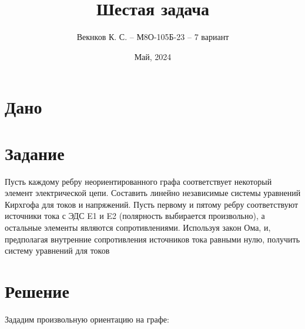 \documentclass{article}
\title{Шестая задача}
\author{Векнков К. С. -- М8О-105Б-23 -- 7 вариант}
\date{Май, 2024}
\begin{document}
\maketitle

\section*{Дано}
\begin{center}
\end{center}


\section*{Задание}
Пусть каждому ребру неориентированного графа соответствует некоторый элемент 
электрической цепи. Составить линейно независимые системы уравнений Кирхгофа для
токов и напряжений. Пусть первому и пятому ребру соответствуют источники тока с ЭДС 
E1 и E2 (полярность выбирается произвольно), а остальные элементы являются сопротивлениями.
Используя закон Ома, и, предполагая внутренние сопротивления источников тока
равными нулю, получить систему уравнений для токов


\section*{Решение}
Зададим произвольную ориентацию на графе:
\end{document}
